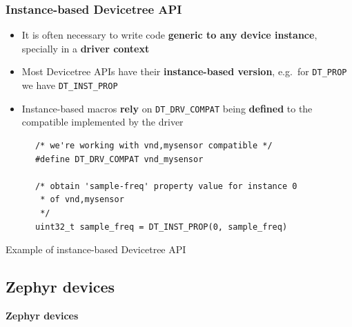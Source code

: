 \documentclass[handout]{beamer}
\begin{document}
\begin{frame}[fragile]
  \frametitle{Instance-based Devicetree API}

  \begin{itemize}
    \item It is often necessary to write code
          \textbf{generic to any device instance}, specially in a
          \textbf{driver context}
    \item Most Devicetree APIs have their \textbf{instance-based version}, e.g.\
          for \texttt{DT\_PROP} we have \texttt{DT\_INST\_PROP}
    \item Instance-based macros \textbf{rely} on \texttt{DT\_DRV\_COMPAT} being
          \textbf{defined} to the compatible implemented by the driver
  \end{itemize}

  \begin{listing}[H]
    \begin{verbatim}
      /* we're working with vnd,mysensor compatible */
      #define DT_DRV_COMPAT vnd_mysensor

      /* obtain 'sample-freq' property value for instance 0
       * of vnd,mysensor
       */
      uint32_t sample_freq = DT_INST_PROP(0, sample_freq)
    \end{verbatim}
    \caption{Example of instance-based Devicetree API}
  \end{listing}
\end{frame}

\subsection{Zephyr devices}

\begin{frame}
  \begin{center}
    \Large \textbf{Zephyr devices}
  \end{center}
\end{frame}
\end{document}
